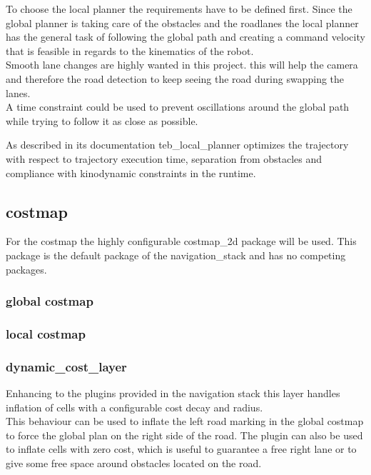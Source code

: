 To choose the local planner the requirements have to be defined first.
Since the global planner is taking care of the obstacles and the roadlanes the local planner has the general task of following the global path and creating a command velocity that is feasible in regards to the kinematics of the robot.\\

Smooth lane changes are highly wanted in this project. this will help the camera and therefore the road detection to keep seeing the road during swapping the lanes.\\

A time constraint could be used to prevent oscillations around the global path while trying to follow it as close as possible.

As described in its documentation teb\_local\_planner optimizes the trajectory with respect to trajectory execution time, separation from obstacles and compliance with kinodynamic constraints in the runtime.





\subsection{costmap}
For the costmap the highly configurable costmap\_2d package will be used. This package is the default package of the navigation\_stack and has no competing packages.
\subsubsection{global costmap}
\subsubsection{local costmap}

\subsubsection{dynamic\_cost\_layer}
Enhancing to the plugins provided in the navigation stack this layer handles inflation of cells with a configurable cost decay and radius.\\

This behaviour can be used to inflate the left road marking in the global costmap to force the global plan on the right side of the road. The plugin can also be used to inflate cells with zero cost, which is useful to guarantee a free right lane or to give some free space around obstacles located on the road.\\

